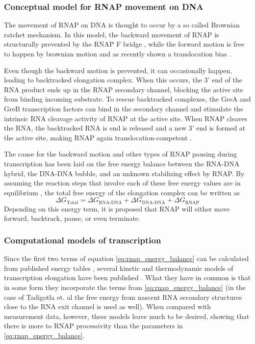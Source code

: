 \subsubsection{Conceptual model for RNAP movement on DNA}
The movement of RNAP on DNA is thought to occur by a so called Brownian ratchet
mechanism. In this model, the backward movement of RNAP is structurally
prevented by the RNAP F bridge \cite{_ratchet_2005}, while the forward motion
is free to happen by brownian motion and as recently shown a translocation bias
\cite{hein_rna_2011}.

Even though the backward motion is prevented, it can occasionally happen,
leading to backtracked elongation complex. When this occurs, the 3' end of the
RNA product ends up in the RNAP secondary channel, blocking the active site
from binding incoming substrate. To rescue backtracked complexes, the GreA and
GreB transcription factors can bind in the secondary channel and stimulate the
intrinsic RNA cleavage activity of RNAP at the active site. When RNAP cleaves
the RNA, the backtracked RNA is end is released and a new 3' end is formed at
the active site, making RNAP again translocation-competent
\cite{toulme_grea_2000}.

The cause for the backward motion and other types of RNAP pausing during
transcription has been laid on the free energy balance between the RNA-DNA
hybrid, the DNA-DNA bubble, and an unknown stabilizing effect by
RNAP\cite{greive_thinking_2005}. By assuming the reaction steps that involve
each of these free energy values are in equilibrium
\cite{greive_thinking_2005}, the total free energy of the elongation complex
can be written as 
\begin{equation}
	\Delta G_{\text{Total}} = \Delta G_{\text{RNA-DNA}} + \Delta
	G_{\text{DNA-DNA}} + \Delta G_{\text{RNAP}}
	\label{eq:rnap_energy_balance}
\end{equation}
Depending on this energy term, it is proposed that RNAP will either move
forward, backtrack, pause, or even terminate.

\subsubsection{Computational models of transcription}
Since the first two terms of equation \eqref{eq:rnap_energy_balance} can be
calculated from published energy tables \cite{wu_temperature_2002}
\cite{santalucia_thermodynamics_2004}, several kinetic and thermodynamic models
of transcription elongation have been published
\cite{tadigotla_thermodynamic_2006-1} \cite{bai_sequence-dependent_2004}
\cite{guajardo_model_1997}. What they have in common is that in some form they
incorporate the terms from \eqref{eq:rnap_energy_balance} (in the case of
Tadigotla et. al the free energy from nascent RNA secondary structures close
to the RNA exit channel is used as well). When compared with measurement data,
however, these models leave much to be desired, showing that there is more to
RNAP processivity than the parameters in \eqref{eq:rnap_energy_balance}.

